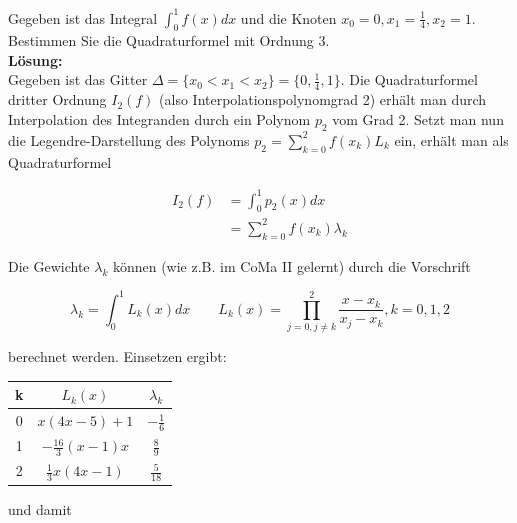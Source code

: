 \documentclass[11pt,a4paper,ngerman]{article}
\begin{document}
Gegeben ist das Integral $\int_0^1 f(x) dx$ und die Knoten $x_0 = 0, x_1 = \frac{1}{4}, x_2 = 1$.
Bestimmen Sie die Quadraturformel mit Ordnung 3.\\

\textbf{Lösung:}\\
%
%
%
Gegeben ist das Gitter $\Delta = \{x_0 < x_1 < x_2 \} = \{0, \frac{1}{4}, 1 \}$.
Die Quadraturformel dritter Ordnung $I_2(f)$ (also Interpolationspolynomgrad 2)
erhält man durch Interpolation des Integranden durch ein Polynom $p_2$ vom Grad 2.
Setzt man nun die Legendre-Darstellung des Polynoms $p_2 = \sum_{k=0}^2 f(x_k)L_k$ ein,
erhält man als Quadraturformel

\begin{equation*}\begin{split}
I_2(f) &= \int_0^1 p_2(x) dx \\
       &= \sum_{k=0}^2 f(x_k) \lambda_k
\end{split}\end{equation*}

Die Gewichte $\lambda_k$ können (wie z.B. im CoMa II gelernt) durch die Vorschrift

\begin{equation*}
  \lambda_k = \int_0^1 L_k(x) dx
  \quad \quad
  L_k(x) = \prod_{j=0,j \neq k}^2 \frac{x-x_k}{x_j - x_k},
  k = 0, 1,2
\end{equation*}

berechnet werden.
Einsetzen ergibt:
\begin{center}
\begin{tabular}{c|c|c}
k & $L_k(x)$ & $\lambda_k$ \\
\hline \hline
0 & $x(4x -5)+1$ & $-\frac{1}{6}$\\
1 & $-\frac{16}{3} (x-1) x$ & $\frac{8}{9}$ \\
2 & $\frac{1}{3}x (4x -1)$ & $\frac{5}{18}$\\
\end{tabular}
\end{center}
und damit
\end{document}
